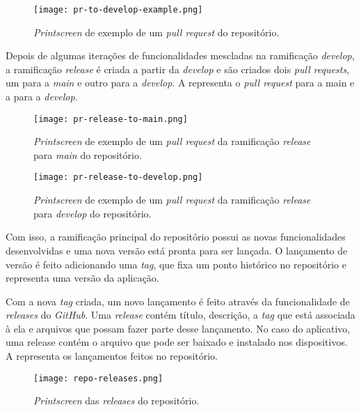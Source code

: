 \begin{figure}[!htb]
  \centering
  \texttt{[image: pr-to-develop-example.png]}
  \caption{\textit{Printscreen} de exemplo de um \textit{pull request} do repositório.}
  \label{fig:cfpr}
\end{figure}

Depois de algumas iterações de funcionalidades mescladas na ramificação \textit{develop}, a ramificação \textit{release} é criada a partir da \textit{develop} e são criados dois \textit{pull requests}, um para a \textit{main} e outro para a \textit{develop}. A  representa o \textit{pull request} para a main e a  para a \textit{develop}.

\begin{figure}[!htb]
  \centering
  \texttt{[image: pr-release-to-main.png]}
  \caption{\textit{Printscreen} de exemplo de um \textit{pull request} da ramificação \textit{release} para \textit{main} do repositório.}
  \label{fig:releasemainpr}
\end{figure}

\begin{figure}[!htb]
  \centering
  \texttt{[image: pr-release-to-develop.png]}
  \caption{\textit{Printscreen} de exemplo de um \textit{pull request} da ramificação \textit{release} para \textit{develop} do repositório.}
  \label{fig:releasedeveloppr}
\end{figure}

Com isso, a ramificação principal do repositório possui as novas funcionalidades desenvolvidas e uma nova versão está pronta para ser lançada. O lançamento de versão é feito adicionando uma \textit{tag}, que fixa um ponto histórico no repositório e representa uma versão da aplicação.

Com a nova \textit{tag} criada, um novo lançamento é feito através da funcionalidade de \textit{releases} do \textit{GitHub}. Uma \textit{release} contém título, descrição, a \textit{tag} que está associada à ela e arquivos que possam fazer parte desse lançamento. No caso do aplicativo, uma release contém o arquivo  que pode ser baixado e instalado nos dispositivos. A  representa os lançamentos feitos no repositório.

\begin{figure}[!htb]
  \centering
  \texttt{[image: repo-releases.png]}
  \caption{\textit{Printscreen} das \textit{releases} do repositório.}
  \label{fig:currentreleases}
\end{figure}

